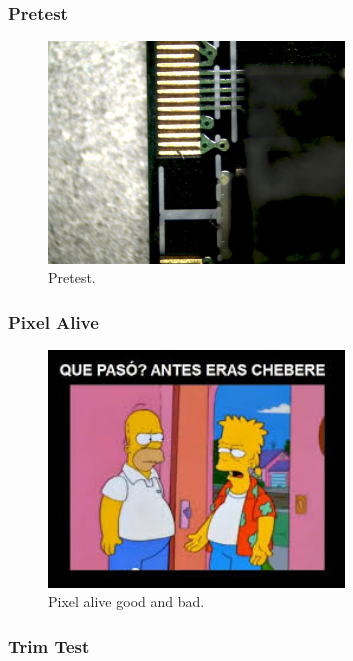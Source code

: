 \subsubsection{Pretest}


\begin{figure}[!h]
  \centering
  \includegraphics[width=0.7\textwidth]{../images/ch7/2}
  \caption[Pretest]{Pretest.}\label{fig:vis_insp}
\end{figure}


\subsubsection{Pixel Alive}


\begin{figure}[!h]
  \centering
  \includegraphics[width=0.7\textwidth]{../images/ch7/3}
  \caption[Pixel alive.]{Pixel alive good and bad.}\label{fig:vis_insp}
\end{figure}


\subsubsection{Trim Test}


